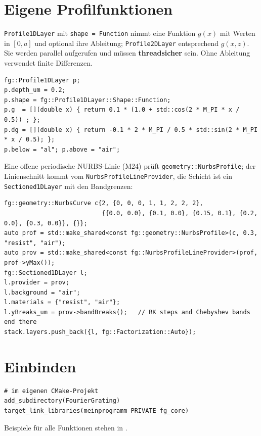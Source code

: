 \section{Eigene Profilfunktionen}
\texttt{Profile1DLayer} mit \texttt{shape = Function} nimmt eine Funktion $g(x)$ mit Werten in $[0,a]$ und optional
ihre Ableitung; \texttt{Profile2DLayer} entsprechend $g(x,z)$. Sie werden parallel aufgerufen und müssen
\textbf{threadsicher} sein. Ohne Ableitung verwendet \FG{} finite Differenzen.
\begin{lstlisting}[style=cpp]
fg::Profile1DLayer p;
p.depth_um = 0.2;
p.shape = fg::Profile1DLayer::Shape::Function;
p.g  = [](double x) { return 0.1 * (1.0 + std::cos(2 * M_PI * x / 0.5)) ; };
p.dg = [](double x) { return -0.1 * 2 * M_PI / 0.5 * std::sin(2 * M_PI * x / 0.5); };
p.below = "al"; p.above = "air";
\end{lstlisting}

Eine offene periodische NURBS-Linie (M24) prüft \texttt{geometry::NurbsProfile}; der Linienschnitt kommt vom
\texttt{NurbsProfileLineProvider}, die Schicht ist ein \texttt{Sectioned1DLayer} mit den Bandgrenzen:
\begin{lstlisting}[style=cpp]
fg::geometry::NurbsCurve c{2, {0, 0, 0, 1, 1, 2, 2, 2},
                           {{0.0, 0.0}, {0.1, 0.0}, {0.15, 0.1}, {0.2, 0.0}, {0.3, 0.0}}, {}};
auto prof = std::make_shared<const fg::geometry::NurbsProfile>(c, 0.3, "resist", "air");
auto prov = std::make_shared<const fg::NurbsProfileLineProvider>(prof, prof->yMax());
fg::Sectioned1DLayer l;
l.provider = prov;
l.background = "air";
l.materials = {"resist", "air"};
l.yBreaks_um = prov->bandBreaks();   // RK steps and Chebyshev bands end there
stack.layers.push_back({l, fg::Factorization::Auto});
\end{lstlisting}

\section{Einbinden}
\begin{lstlisting}[style=shell]
# im eigenen CMake-Projekt
add_subdirectory(FourierGrating)
target_link_libraries(meinprogramm PRIVATE fg_core)
\end{lstlisting}
Beispiele für alle Funktionen stehen in .
